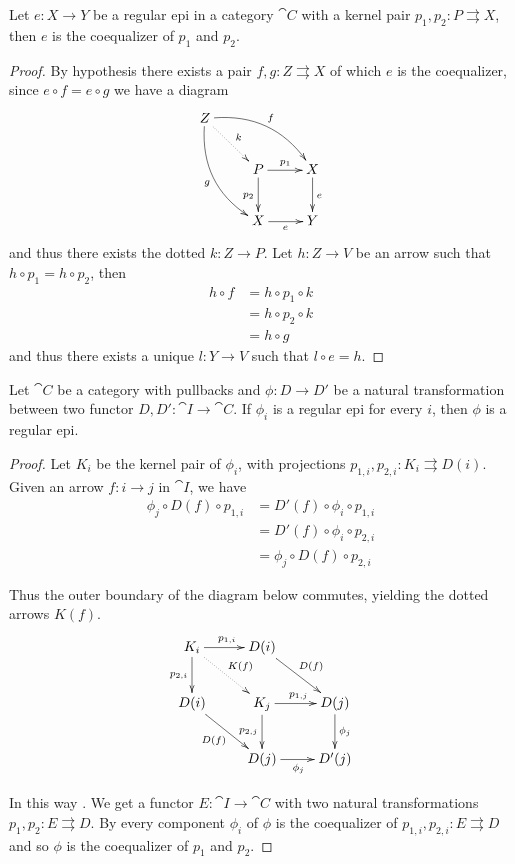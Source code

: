 \begin{prop}\label{prop:regepi}
	Let $e\colon X\to Y$ be a regular epi in a category $\cat{C}$ with a kernel pair $p_1, p_2\colon P\rightrightarrows X$, then $e$ is the coequalizer of $p_1$ and $p_2$.
\end{prop}
\begin{proof}
	By hypothesis there exists a pair $f, g\colon Z\rightrightarrows X$ of which $e$ is the coequalizer, since $e\circ f=e\circ g$ we have a diagram
	\[\xymatrix{	Z \ar@/^.5cm/[drr]^{f} \ar@/_.5cm/[ddr]_{g} \ar@{.>}[dr]^{k}& &	\\ &P\ar[r]^{p_1} \ar[d]_{p_2} & X \ar[d]^{e} \\& X \ar[r]_{e}  & Y}\]
	and thus there exists  the dotted $k\colon Z\to P$. Let $h\colon Z\to V$ be an arrow such that $h\circ p_1=h\circ p_2$, then
	\begin{align*}h\circ f &= h \circ p_1\circ k \\&= h \circ p_2\circ k \\&=h\circ g
	\end{align*}
	and thus there exists a unique $l\colon Y\to V$ such that $l\circ e=h$.
\end{proof}


\begin{cor}\label{cor:regepi1}
Let $\cat{C}$ be a category with pullbacks and $\phi\colon D\to D'$ be a natural transformation between two functor $D, D'\colon \cat{I}\to \cat{C}$. If $\phi_i$ is a regular epi for every $i$, then $\phi$ is a regular epi.
\end{cor}
\begin{proof}
	Let $K_i$ be the kernel pair of $\phi_i$, with projections $p_{1,i}, p_{2,i}\colon K_i\rightrightarrows D(i)$. Given an arrow $f\colon i\to j$ in $\cat{I}$, we have 
	\begin{align*}
		\phi_j\circ D(f)\circ p_{1,i}&=D'(f)\circ \phi_i\circ p_{1,i}\\&=D'(f)\circ \phi_i\circ p_{2,i}\\&=\phi_j\circ D(f)\circ p_{2,i}
	\end{align*}
	
	
	Thus the outer boundary of the diagram below commutes, yielding the dotted arrows $K(f)$.
	\[\xymatrix{K_i \ar@{.>}[dr]^{K(f)}\ar[r]^{p_{1,i}} \ar[d]_{p_{2,i}}& D(i) \ar[dr]^{D(f)}\\D(i) \ar[dr]_{D(f)}&K_j \ar[r]^{p_{1,j}} \ar[d]_{p_{2,j}} & D(j) \ar[d]^{\phi_j}\\ &D(j) \ar[r]_{\phi_j} & D'(j)}\]
	
	In this way . We get a functor $E\colon \cat{I}\to \cat{C}$ with two natural transformations $p_{1}, p_2\colon E\rightrightarrows D$. By  every component  $\phi_i$ of $\phi$ is the coequalizer of $p_{1,i}, p_{2,i}\colon E\rightrightarrows D$ and so $\phi$ is the coequalizer of $p_1$ and $p_2$.
\end{proof}

